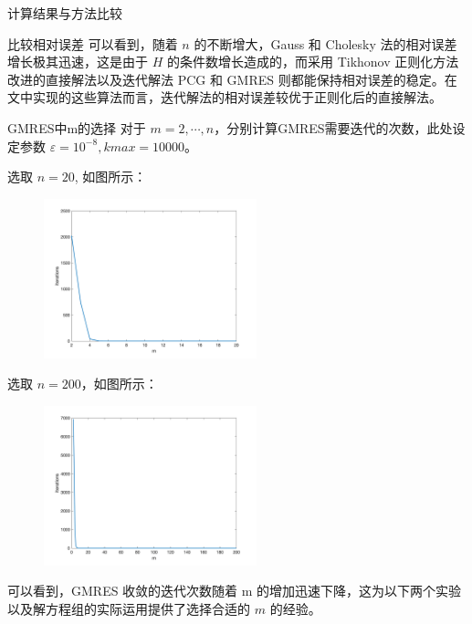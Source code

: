 \documentclass[a4paper]{article}
\begin{document}
\begin{multicols}{2}
\begin{section}{计算结果与方法比较}
\begin{subsection}{比较相对误差}
		可以看到，随着 $n$ 的不断增大，Gauss 和 Cholesky 法的相对误差增长极其迅速，这是由于 $H$ 的条件数增长造成的，而采用 Tikhonov 正则化方法改进的直接解法以及迭代解法 PCG 和 GMRES 则都能保持相对误差的稳定。在文中实现的这些算法而言，迭代解法的相对误差较优于正则化后的直接解法。

	\end{subsection}
	
	\begin{subsection}{GMRES中m的选择}
		对于 $m=2,\cdots, n$，分别计算GMRES需要迭代的次数，此处设定参数 $\varepsilon = 10^{-8}, kmax=10000$。
		
		选取 $n=20$, 如图所示：
		
		\begin{figure}[H]
			\centering
			\includegraphics[width = 0.55\textwidth]{img/gmres20.png} 
			\label{gmres20} 
		\end{figure}
		
		选取 $n=200$，如图所示：
		
		\begin{figure}[H]
			\centering
			\includegraphics[width = 0.55\textwidth]{img/gmres200.png} 
			\label{gmres200} 
		\end{figure}
		
		可以看到，GMRES 收敛的迭代次数随着 m 的增加迅速下降，这为以下两个实验以及解方程组的实际运用提供了选择合适的 $m$ 的经验。
	\end{subsection}


\end{section}
\end{multicols}
\end{document}
